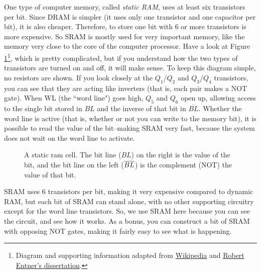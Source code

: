 One type of computer memory, called \emph{static RAM}, uses at least six transistors per bit. Since  DRAM is simpler (it uses only one transistor and one capacitor per bit), it is also cheaper. Therefore, to store one bit with 6 or more transistors is more expensive. So SRAM is mostly used for very important memory, like the memory very close to the core of the computer processor. Have a look at Figure \ref{fig:sram}\footnote{Diagram and supporting information adapted from {\color{webblue}\href{https://en.wikipedia.org/wiki/Static_random-access_memory}{Wikipedia}} and {\color{webblue}\href{https://www.entner.net/sites/default/files/diss-entner-final-v1.pdf}{Robert Entner's dissertation}}.}, 
which is pretty complicated, but if you understand how the two types of transistors are turned on and off, it will make sense. To keep this diagram simple, no resistors are shown. If you look closely at the $Q_1$/$Q_2$ and $Q_3$/$Q_4$ transistors, you can see that they are acting like inverters (that is, each pair makes a NOT gate). When WL (the ``word line") goes high, $Q_5$ and $Q_6$ open up, allowing access to the single bit stored in $BL$ and the inverse of that bit in $\overline{BL}$. Whether the word line is active (that is, whether or not you can write to the memory bit), it is possible to read the value of the bit--making SRAM very fast, because the system does not wait on the word line to activate.


\begin{figure}[h!]
\begin{center}

\caption{A static ram cell. The bit line ($BL$) on the right is the value of the bit, and the bit line on the left ($\overline{BL}$) is the complement (NOT) the value of that bit.} %
\label{fig:sram}
\end{center}
\end{figure}

SRAM uses 6 transistors per bit, making it very expensive compared to dynamic RAM, 
but each bit of SRAM can stand alone, with no other supporting circuitry except 
for the word line transistors. So, we use SRAM here because you can see the 
circuit, and see how it works. As a bonus, you can construct a bit of SRAM with 
opposing NOT gates, making it fairly easy to see what is happening.

